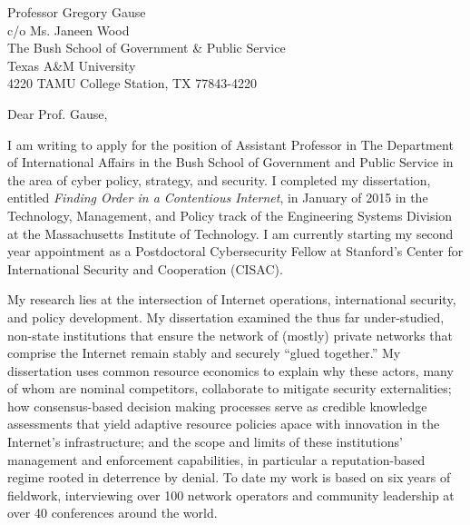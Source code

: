 \documentclass{letter}[12pt]
\date{20 September 2017}
\begin{document}
\begin{letter}{ Professor Gregory Gause \\
                c/o Ms. Janeen Wood \\
                The Bush School of Government \& Public Service \\
                Texas A\&M University \\
                4220 TAMU
                College Station, TX 77843-4220
              }


\opening{Dear Prof. Gause,}

I am writing to apply for the position of Assistant Professor in The
Department of International Affairs in the Bush School of Government
and Public Service in the area of cyber policy, strategy, and
security.  
%
I completed my dissertation, entitled \emph{Finding Order in a Contentious
Internet}, in January of 2015 in the Technology, Management, and Policy
track of the Engineering Systems Division at the Massachusetts
Institute of Technology.
%
I am currently starting my second year appointment as a Postdoctoral Cybersecurity Fellow at Stanford's Center for International Security and Cooperation (CISAC).

My research lies at the intersection of Internet operations,
international security, and policy development.  
%
My dissertation
examined the thus far under-studied, non-state institutions that
ensure the network of (mostly) private networks that comprise
the Internet remain stably and securely ``glued
together.''
%
My dissertation uses common resource economics to explain why these
actors, many of whom are nominal competitors, collaborate to mitigate
security externalities; how consensus-based decision making processes
serve as credible knowledge assessments that yield adaptive resource
policies apace with innovation in the Internet's infrastructure; and
the scope and limits of these institutions' management and enforcement
capabilities, in particular a reputation-based regime rooted in
deterrence by denial.
%
To date my work is based on six years of fieldwork, interviewing over 100 network operators and community leadership at over 40 conferences around the world.


\end{letter}
\end{document}
